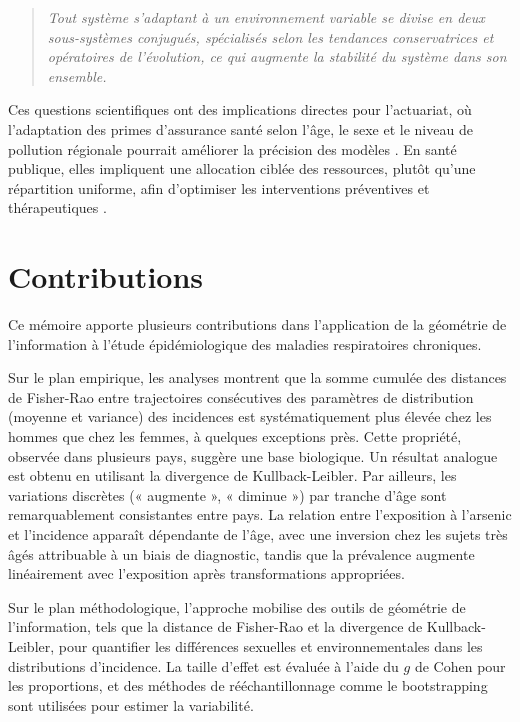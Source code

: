 \begin{quote}
	\emph{Tout système s'adaptant à un environnement variable se divise en deux sous-systèmes conjugués, spécialisés selon les tendances conservatrices et opératoires de l'évolution, ce qui augmente la stabilité du système dans son ensemble.}
\end{quote}

Ces questions scientifiques ont des implications directes pour l'actuariat, où l'adaptation des primes d'assurance santé selon l'âge, le sexe et le niveau de pollution régionale pourrait améliorer la précision des modèles \citep{bolviken2014computation}. En santé publique, elles impliquent une allocation ciblée des ressources, plutôt qu'une répartition uniforme, afin d'optimiser les interventions préventives et thérapeutiques \citep{read2010gender}.

\section{Contributions}

Ce mémoire apporte plusieurs contributions dans l'application de la géométrie de l'information à l'étude épidémiologique des maladies respiratoires chroniques.

Sur le plan empirique, les analyses montrent que la somme cumulée des distances de Fisher-Rao entre trajectoires consécutives des paramètres de distribution (moyenne et variance) des incidences est systématiquement plus élevée chez les hommes que chez les femmes, à quelques exceptions près. Cette propriété, observée dans plusieurs pays, suggère une base biologique. Un résultat analogue est obtenu en utilisant la divergence de Kullback-Leibler. Par ailleurs, les variations discrètes (« augmente », « diminue ») par tranche d'âge sont remarquablement consistantes entre pays. La relation entre l'exposition à l'arsenic et l'incidence apparaît dépendante de l'âge, avec une inversion chez les sujets très âgés attribuable à un biais de diagnostic, tandis que la prévalence augmente linéairement avec l'exposition après transformations appropriées.

Sur le plan méthodologique, l'approche mobilise des outils de géométrie de l'information, tels que la distance de Fisher-Rao et la divergence de Kullback-Leibler, pour quantifier les différences sexuelles et environnementales dans les distributions d'incidence. La taille d'effet est évaluée à l'aide du \( g \) de Cohen pour les proportions, et des méthodes de rééchantillonnage comme le bootstrapping sont utilisées pour estimer la variabilité.


